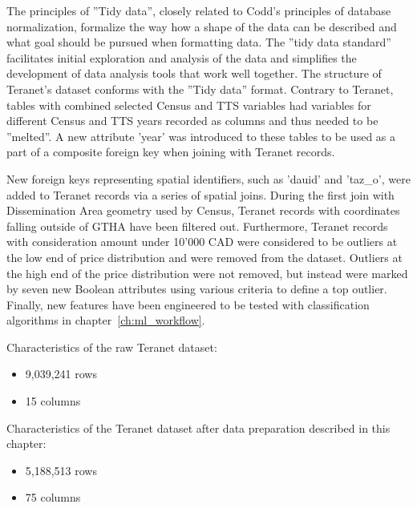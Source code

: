 The principles of ''Tidy data'', closely related to Codd's principles of database normalization, formalize the way how a shape of the data can be described and what goal should be pursued when formatting data.
The ''tidy data standard''  facilitates initial exploration and analysis of the data and simplifies the development of data analysis tools that work well together.
The structure of Teranet's dataset conforms with the ''Tidy data'' format.
Contrary to Teranet, tables with combined selected Census and TTS variables had variables for different Census and TTS years recorded as columns and thus needed to be ''melted''.
A new attribute 'year' was introduced to these tables to be used as a part of a composite foreign key when joining with Teranet records.

New foreign keys representing spatial identifiers, such as 'dauid' and 'taz\_o', were added to Teranet records via a series of spatial joins.
During the first join with Dissemination Area geometry used by Census, Teranet records with coordinates falling outside of GTHA have been filtered out.
Furthermore, Teranet records with consideration amount under 10'000 CAD were considered to be outliers at the low end of price distribution and were removed from the dataset.
Outliers at the high end of the price distribution were not removed, but instead were marked by seven new Boolean attributes using various criteria to define a top outlier.
Finally, new features have been engineered to be tested with classification algorithms in chapter~\ref{ch:ml_workflow}.

\vspace{5mm}

Characteristics of the raw Teranet dataset:
\begin{itemize}
    \item 9,039,241 rows
    \item 15 columns
\end{itemize}

Characteristics of the Teranet dataset after data preparation described in this chapter:
\begin{itemize}
    \item 5,188,513 rows
    \item 75 columns
\end{itemize}
